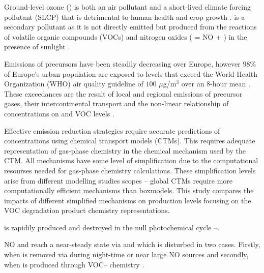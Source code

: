 Ground-level ozone () is both an air pollutant and a short-lived climate forcing pollutant (SLCP) that is detrimental to human health and crop growth \citep{AQEU:2013}. 
 is a secondary pollutant as it is not directly emitted but produced from the reactions of volatile organic compounds (VOCs) and nitrogen oxides ( = NO + ) in the presence of sunlight \citep{Atkinson:2000}.

Emissions of  precursors have been steadily decreasing over Europe, however $98$\% of Europe's urban population are exposed to levels that exceed the World Health Organization (WHO) air quality guideline of $100$ $\mu$g/m$^3$ over an $8$-hour mean \citep{WHO:2006}. 
These exceedances are the result of local and regional emissions of  precursor gases, their intercontinental transport and the non-linear relationship of  concentrations on  and VOC levels \citep{AQEU:2013}.

Effective emission reduction strategies require accurate predictions of  concentrations using chemical transport models (CTMs). 
This requires adequate representation of gas-phase chemistry in the chemical mechanism used by the CTM. 
All mechanisms have some level of simplification due to the computational resourses needed for gas-phase chemistry calculations. 
These simplification levels arise from different modelling studies scopes -- global CTMs require more computationally efficient mechanisms than boxmodels. 
This study compares the impacts of different simplified mechanisms on  production levels focusing on the VOC degradation product chemistry representations.

 is rapidily produced and destroyed in the null photochemical cycle --. 
\begin{reactionlist}
\end{reactionlist}
NO and  reach a near-steady state via  and  which is disturbed in two cases. 
Firstly, when  is removed via  during night-time or near large NO sources and secondly, when  is produced through VOC-- chemistry \citep{Sillman:1999}.

